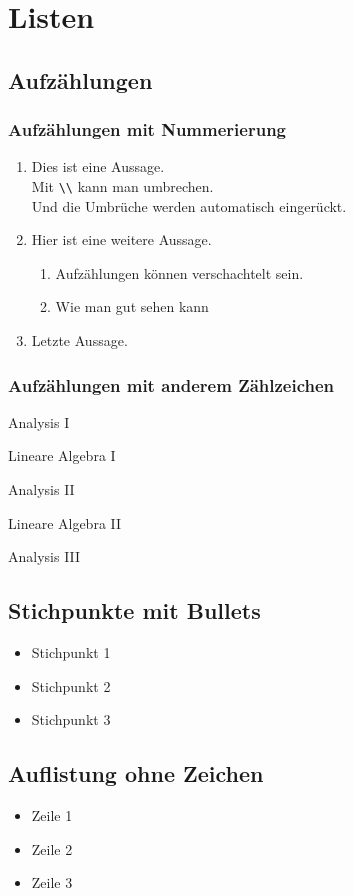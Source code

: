 \documentclass[
	10pt,
	parskip=half-,		%
	paper=a4,			%
	english, ngerman		%
	]{scrartcl}			%
\begin{document}
\section{Listen}
\subsection{Aufzählungen}

\subsubsection{Aufzählungen mit Nummerierung}
\begin{enumerate}
	\item Dies ist eine Aussage.\\
		  Mit \verb|\\| kann man umbrechen.\\
		  Und die Umbrüche werden automatisch eingerückt.
	\item Hier ist eine weitere Aussage.
	\begin{enumerate}
		\item Aufzählungen können verschachtelt sein.
		\item Wie man gut sehen kann
	\end{enumerate}
	\item Letzte Aussage.
\end{enumerate}

\subsubsection{Aufzählungen mit anderem Zählzeichen}
\begin{compactenum}[(i)]
	\item Analysis I
	\item Lineare Algebra I
	\item Analysis II
	\item Lineare Algebra II
	\item Analysis III
\end{compactenum}

\subsection{Stichpunkte mit Bullets}
\begin{itemize}
	\item Stichpunkt 1 
	\item Stichpunkt 2
	\item Stichpunkt 3
\end{itemize}

\subsection{Auflistung ohne Zeichen}
\begin{itemize}
\item[] Zeile 1 
\item[] Zeile 2
\item[] Zeile 3
\end{itemize}
\end{document}
